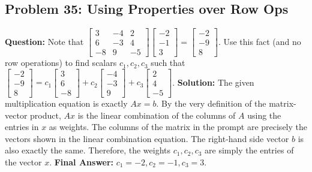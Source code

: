 \documentclass{article}
\begin{document}
\subsection{Problem 35: Using Properties over Row Ops}
\textbf{Question:} Note that $\begin{bmatrix} 3 & -4 & 2 \\ 6 & -3 & 4 \\ -8 & 9 & -5 \end{bmatrix} \begin{bmatrix} -2 \\ -1 \\ 3 \end{bmatrix} = \begin{bmatrix} -2 \\ -9 \\ 8 \end{bmatrix}$. Use this fact (and no row operations) to find scalars $c_1, c_2, c_3$ such that $\begin{bmatrix} -2 \\ -9 \\ 8 \end{bmatrix} = c_1 \begin{bmatrix} 3 \\ 6 \\ -8 \end{bmatrix} + c_2 \begin{bmatrix} -4 \\ -3 \\ 9 \end{bmatrix} + c_3 \begin{bmatrix} 2 \\ 4 \\ -5 \end{bmatrix}$.
\textbf{Solution:}
The given multiplication equation is exactly $Ax = b$. By the very definition of the matrix-vector product, $Ax$ is the linear combination of the columns of $A$ using the entries in $x$ as weights.
The columns of the matrix in the prompt are precisely the vectors shown in the linear combination equation. The right-hand side vector $b$ is also exactly the same.
Therefore, the weights $c_1, c_2, c_3$ are simply the entries of the vector $x$.
\textbf{Final Answer:} $c_1 = -2, c_2 = -1, c_3 = 3$.
\end{document}
